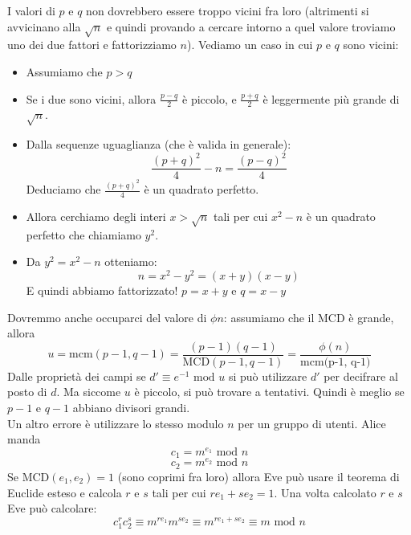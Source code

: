I valori di $p$ e $q$ non dovrebbero essere troppo vicini fra loro (altrimenti si avvicinano alla $\sqrt{n}$ e quindi provando a cercare intorno a quel valore troviamo uno dei due fattori e fattorizziamo $n$).
Vediamo un caso in cui $p$ e $q$ sono vicini:
\begin{itemize}
	\item Assumiamo che $p>q$
	\item Se i due sono vicini, allora $\frac{p-q}{2}$ è piccolo, e $\frac{p+q}{2}$ è leggermente più grande di $\sqrt{n}$.
	\item Dalla sequenze uguaglianza (che è valida in generale):
	\begin{equation*}
		\frac{(p+q)^2}{4} - n = \frac{(p-q)^2}{4}
	\end{equation*}
	Deduciamo che $\frac{(p+q)^2}{4}$ è un quadrato perfetto.
	\item Allora cerchiamo degli interi $x > \sqrt{n}$ tali per cui $x^2-n$ è un quadrato perfetto che chiamiamo $y^2$.
	\item Da $y^2 = x^2 -n$ otteniamo:
	\begin{equation*}
		n = x^2-y^2 =(x+y)(x-y)
	\end{equation*}
	E quindi abbiamo fattorizzato! $p=x+y$ e $q=x-y$
\end{itemize}


Dovremmo anche occuparci del valore di $\phi{n}$: assumiamo che il MCD è grande, allora
\begin{equation*}
	u = \text{mcm}(p-1,q-1) = \frac{(p-1)(q-1)}{\text{MCD}(p-1,q-1)} = \frac{\phi(n)}{\text{mcm(p-1, q-1)}}
\end{equation*}
Dalle proprietà dei campi se $d' \equiv e^{-1} \text{ mod } u $ si può utilizzare $d'$ per decifrare al posto di $d$. Ma siccome $u$ è piccolo, si può trovare a tentativi. Quindi è meglio se $p-1$ e $q-1$ abbiano divisori grandi.\\

Un altro errore è utilizzare lo stesso modulo $n$ per un gruppo di utenti.
Alice manda
\begin{equation*}
	c_1 = m^{e_1} \text { mod } n
\end{equation*}
\begin{equation*}
	c_2 = m^{e_2} \text { mod } n
\end{equation*}
Se MCD$(e_1, e_2) = 1$ (sono coprimi fra loro) allora Eve può usare il teorema di Euclide esteso e calcola $r$ e $s$ tali per cui $re_1 + se_2 = 1$.
Una volta calcolato $r$ e $s$ Eve può calcolare:
\begin{equation*}
	c_1^rc_2^s \equiv m^{re_1}m^{se_2} \equiv m^{re_1 + se_2} \equiv m \text { mod } n
\end{equation*}

